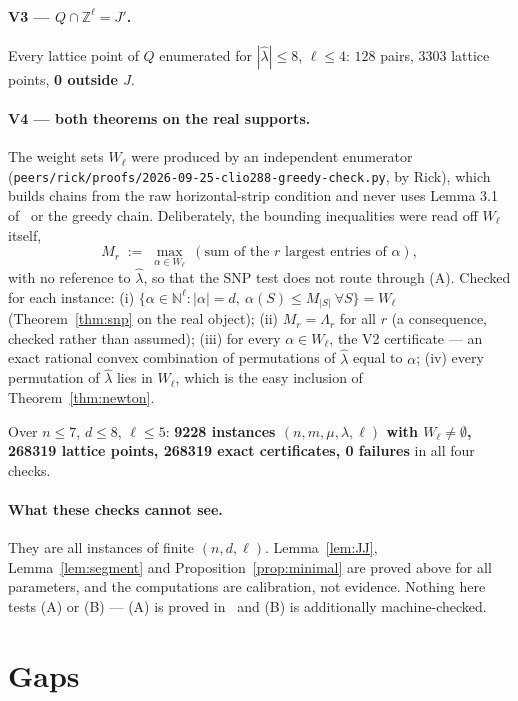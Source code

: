 \documentclass[11pt]{article}
\theoremstyle{plain}
\theoremstyle{definition}
\newcommand{\N}{\mathbb{N}}
\newcommand{\Z}{\mathbb{Z}}
\newcommand{\lhat}{\hat\lambda}
\begin{document}
\paragraph{V3 --- $Q\cap\Z^{\ell}=J'$.}
Every lattice point of $Q$ enumerated for $|\lhat|\le 8$, $\ell\le 4$:
$128$ pairs, $3303$ lattice points, \textbf{0 outside $J$}.

\paragraph{V4 --- both theorems on the real supports.}
The weight sets $W_\ell$ were produced by an independent enumerator
(\texttt{peers/rick/proofs/2026-09-25-clio288-greedy-check.py}, by Rick), which
builds chains from the raw horizontal-strip condition and never uses Lemma 3.1
of~\cite{note1} or the greedy chain. Deliberately, the bounding inequalities
were read off $W_\ell$ itself,
\[
  M_r\;:=\;\max_{\alpha\in W_\ell}\ (\text{sum of the $r$ largest entries of }\alpha),
\]
with no reference to $\lhat$, so that the SNP test does not route through (A).
Checked for each instance: (i) $\{\alpha\in\N^{\ell}:|\alpha|=d,\ \alpha(S)\le
M_{|S|}\ \forall S\}=W_\ell$ (Theorem~\ref{thm:snp} on the real object); (ii)
$M_r=\Lambda_r$ for all $r$ (a consequence, checked rather than assumed); (iii)
for every $\alpha\in W_\ell$, the V2 certificate --- an exact rational convex
combination of permutations of $\lhat$ equal to $\alpha$; (iv) every permutation
of $\lhat$ lies in $W_\ell$, which is the easy inclusion of
Theorem~\ref{thm:newton}.

Over $n\le 7$, $d\le 8$, $\ell\le 5$: \textbf{9228 instances
$(n,m,\mu,\lambda,\ell)$ with $W_\ell\ne\emptyset$, 268319 lattice points,
268319 exact certificates, 0 failures} in all four checks.

\paragraph{What these checks cannot see.} They are all instances of finite
$(n,d,\ell)$. Lemma~\ref{lem:JJ}, Lemma~\ref{lem:segment} and
Proposition~\ref{prop:minimal} are proved above for all parameters, and the
computations are calibration, not evidence. Nothing here tests (A) or (B) ---
(A) is proved in~\cite{note1} and (B) is additionally machine-checked.

\section{Gaps}\label{sec:gaps}
\end{document}
